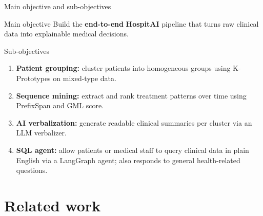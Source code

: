 \documentclass[aspectratio=169,11pt]{beamer}
\newcommand{\kw}[1]{{\color{hospaccent}\bfseries #1}}
\begin{document}
\begin{frame}{Main objective and sub-objectives}
  \begin{block}{Main objective}
    \small Build the \kw{end-to-end} \textbf{HospitAI} pipeline that turns raw clinical data into explainable medical decisions.
  \end{block}
  \vspace{0.3em}
  \begin{block}{Sub-objectives}
    \small
    \begin{enumerate}\setlength{\itemsep}{0.25em}
      \item \kw{Patient grouping:} cluster patients into homogeneous groups using K-Prototypes on mixed-type data.
      \item \kw{Sequence mining:} extract and rank treatment patterns over time using PrefixSpan and GML score.
      \item \kw{AI verbalization:} generate readable clinical summaries per cluster via an LLM verbalizer.
      \item \kw{SQL agent:} allow patients or medical staff to query clinical data in plain English via a LangGraph agent; also responds to general health-related questions.
    \end{enumerate}
  \end{block}
\end{frame}

\section{Related work}
\end{document}
